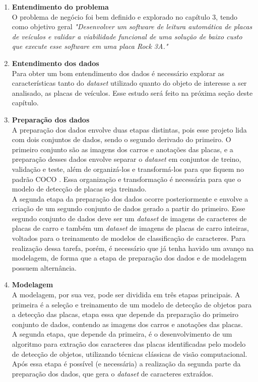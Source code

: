 \begin{enumerate}
    \item \textbf{Entendimento do problema} \\
    O problema de negócio foi bem definido e explorado no capítulo 3, tendo como objetivo geral \textit{"Desenvolver um software de leitura automática de placas de veículos e validar a viabilidade funcional de uma solução de baixo custo que execute esse software em uma placa Rock 3A."}
    \item \textbf{Entendimento dos dados} \\
    Para obter um bom entendimento dos dados é necessário explorar as características tanto do \textit{dataset} utilizado quanto do objeto de interesse a ser analisado, as placas de veículos. Esse estudo será feito na próxima seção deste capítulo.
    \item \textbf{Preparação dos dados} \\
    A preparação dos dados envolve duas etapas distintas, pois esse projeto lida com dois conjuntos de dados, sendo o segundo derivado do primeiro. O primeiro conjunto são as imagens dos carros e anotações das placas, e a preparação desses dados envolve separar o \textit{dataset} em conjuntos de treino, validação e teste, além de organizá-los e transformá-los para que fiquem no padrão COCO \cite{coco}. Essa organização e transformação é necessária para que o modelo de detecção de placas seja treinado. \\ 
    A segunda etapa da preparação dos dados ocorre posteriormente e envolve a criação de um segundo conjunto de dados gerado a partir do primeiro. Esse segundo conjunto de dados deve ser um \textit{dataset} de imagens de caracteres de placas de carro e também um \textit{dataset} de imagens de placas de carro inteiras, voltados para o treinamento de modelos de classificação de caracteres. Para realização dessa tarefa, porém, é necessário que já tenha havido um avanço na modelagem, de forma que a etapa de preparação dos dados e de modelagem possuem alternância.
    \item \textbf{Modelagem} \\
    A modelagem, por sua vez, pode ser dividida em três etapas principais. A primeira é a seleção e treinamento de um modelo de detecção de objetos para a detecção das placas, etapa essa que depende da preparação do primeiro conjunto de dados, contendo as imagens dos carros e anotações das placas. \\
    A segunda etapa, que depende da primeira, é o desenvolvimento de um algoritmo para extração dos caracteres das placas identificadas pelo modelo de detecção de objetos, utilizando técnicas clássicas de visão computacional. Após essa etapa é possível (e necessária) a realização da segunda parte da preparação dos dados, que gera o \textit{dataset} de caracteres extraídos. \\

\end{enumerate}
